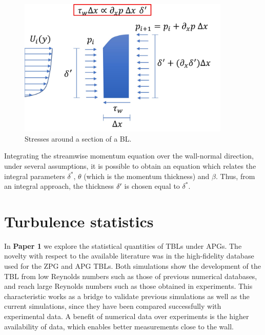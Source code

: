 \begin{figure}
    \centering
    \includegraphics[width=0.90\textwidth]{imgs/schemes/scheme_beta.jpg}
    \caption{Stresses around a section of a BL.}
    \label{fig:scheme_beta}
\end{figure}

Integrating the streamwise momentum equation over the wall-normal direction, under several assumptions, it is possible to obtain an equation which relates the integral parameters $\delta^*$, $\theta$ (which is the momentum thickness) and $\beta$. Thus, from an integral approach, the thickness $\delta ^{\prime}\mkern-1.2mu$ is chosen equal to $\delta^*$. 


\section{Turbulence statistics}
In \textbf{Paper 1} we explore the statistical quantities of TBLs under APGs. The novelty with respect to the available literature was in the high-fidelity database used for the ZPG and APG TBLs. Both simulations show the development of the TBL from low Reynolds numbers such as those of previous numerical databases, and reach large Reynolds numbers such as those obtained in experiments. This characteristic works as a bridge to validate previous simulations as well as the current simulations, since they have been compared successfully with experimental data.
A benefit of numerical data over experiments is the higher availability of data, which enables better measurements close to the wall.

